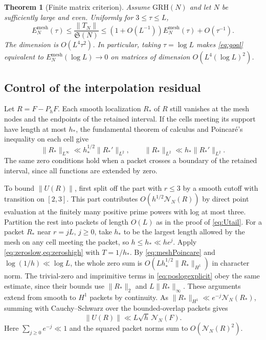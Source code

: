 \documentclass[11pt,a4paper]{article}
\numberwithin{equation}{section}
\newtheorem{theorem}{Theorem}[section]
\newcommand{\SSS}{\mathfrak S}
\newcommand{\grh}{\mathrm{GRH}}
\newcommand{\NN}{\mathcal N_N}
\begin{document}
\begin{theorem}[Finite matrix criterion]
\label{thm:mesh}
Assume $\grh(N)$ and let $N$ be sufficiently large and even.
Uniformly for $3\le \tau\le L$,
\begin{equation}
 E_N^{\mathrm{mesh}}(\tau)
 \le \frac{\|T_N\|}{\SSS(N)}
 \le (1+O(L^{-1}))E_N^{\mathrm{mesh}}(\tau)+O(\tau^{-1}).
 \label{eq:mesh}
\end{equation}
The dimension is $O(L^4\tau^2)$. In particular, taking
$\tau=\log L$ makes \cref{eq:goal} equivalent to
$E_N^{\mathrm{mesh}}(\log L)\to0$ on matrices of dimension
$O(L^4(\log L)^2)$.
\end{theorem}

\subsection{Control of the interpolation residual}

Let $R=F-P_hF$. Each smooth localization $R_*$ of $R$ still
vanishes at the mesh nodes and the endpoints of the retained
interval. If the cells meeting its support have length at most
$h_*$, the fundamental theorem of calculus and Poincar\'e's
inequality on each cell give
\begin{equation}
 \|R_*\|_{L^\infty}\ll h_*^{1/2}\|R_*'\|_{L^2},
 \qquad
 \|R_*\|_{L^2}\ll h_*\|R_*'\|_{L^2}.
 \label{eq:meshPoincare}
\end{equation}
The same zero conditions hold when a packet crosses a boundary of
the retained interval, since all functions are extended by zero.

To bound $\|U(R)\|$, first split off the part with $r\le3$
by a smooth cutoff with transition on $[2,3]$. This part
contributes $O(h^{1/2}\NN(R))$ by direct point evaluation at
the finitely many positive prime powers with log at most three.
Partition the rest into packets of length $O(L)$ as in the
proof of \cref{eq:Utail}. For a packet $R_*$ near $r=jL$, $j\ge0$,
take $h_*$ to be the largest length allowed by the mesh on any
cell meeting the packet, so $h\le h_*\ll h e^j$.
Apply \cref{eq:zeroslow,eq:zeroshigh} with $T=1/h_*$.
By \cref{eq:meshPoincare} and $\log(1/h)\ll\log L$,
the whole zero sum is $O(L h_*^{1/2}\|R_*\|_{H^1})$ in
character norm. The trivial-zero and imprimitive terms in
\cref{eq:poslogexplicit} obey the same estimate, since their
bounds use $\|R_*\|_2$ and $L\|R_*\|_\infty$. These arguments
extend from smooth to $H^1$ packets by continuity.
As $\|R_*\|_{H^1}\ll e^{-j}\NN(R_*)$, summing with
Cauchy--Schwarz over the bounded-overlap packets gives
\begin{equation}
 \|U(R)\|\ll L\sqrt h\,\NN(F).
 \label{eq:meshU}
\end{equation}
Here $\sum_{j\ge0}e^{-j}\ll1$ and the squared packet norms
sum to $O(\NN(R)^2)$.
\end{document}
